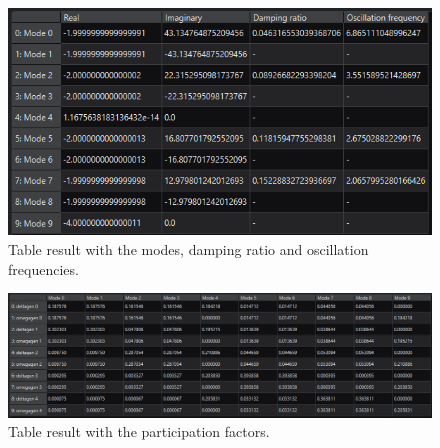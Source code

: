 \begin{figure}[H]
  \centering
  \includegraphics[width=0.8\linewidth]{figures/result_modes_ss_GUI.png}
  \caption{Table result with the modes, damping ratio and oscillation frequencies.}
  \label{fig:table_modes_GUI}
\end{figure}

\begin{figure}[H]
  \centering
  \includegraphics[width=1\linewidth]{figures/result_pfactors_GUI.png}
  \caption{Table result with the participation factors.}
  \label{fig:table_PF_GUI}
\end{figure}

